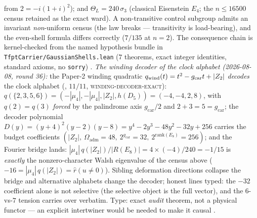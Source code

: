 \documentclass[11pt,a4paper]{article}
\newcommand{\gcar}{g_{\mathrm{car}}}
\newcommand{\Oadm}{\Omega_{\mathrm{adm}}}
\theoremstyle{definition}
\begin{document}
\begin{keybox}
from $2 = -i(1{+}i)^2$); and $\Theta_L = 240\,\sigma_3$
(classical Eisenstein $E_4$; the $n \le 16500$ census retained
as the exact ward).  A non-transitive control subgroup admits an
invariant \emph{non}-uniform census (the law breaks ---
transitivity is load-bearing), and the even-shell formula
differs correctly ($7/135$ at $n = 2$).  The consequence chain
is kernel-checked from the named hypothesis bundle in
\texttt{TfptCarrier/GaussianShells.lean} ($7$ theorems, exact
integer identities, standard axioms, no \texttt{sorry}) \mE.
\emph{The winding decoder of the clock alphabet (2026-08-08,
round 36):} the Paper-2 winding quadratic $q_{\rm wind}(t) = t^2
- \gcar t + |Z_2|$ \emph{decodes} the clock alphabet
(, $11/11$,
\textsc{winding-decoder-exact}): $q(\{2,3,5,6\}) =
(-|\mu_4|, -|\mu_4|, |Z_2|, h(D_5)) = (-4,-4,2,8)$, with $q(2) =
q(3)$ \emph{forced} by the palindrome axis $\gcar/2$ and $2 + 3
= 5 = \gcar$; the decoder polynomial $D(y) = (y{+}4)^2(y{-}2)
(y{-}8) = y^4 - 2y^3 - 48y^2 - 32y + 256$ carries the budget
coefficients $(|Z_2|,\ \Oadm = 48,\ 2^{\gcar} = 32,\
2^{\mathrm{rank}(E_8)} = 256)$; and the Fourier bridge lands:
$|\mu_4|\,q(|Z_2|)/|R(E_8)| = 4\times(-4)/240 = -1/15$ is
\emph{exactly} the nonzero-character Walsh eigenvalue of the
census above ($-16 = |\mu_4|\,q(|Z_2|) = \hat r(u \ne 0)$).
Sibling deformation directions collapse the bridge and
alternative alphabets change the decoder; honest lines typed:
the $-32$ coefficient alone is not selective (the selective
object is the full vector), and the $6$-vs-$7$ tension carries
over verbatim.  Type: exact \emph{audit} theorem, not a physical
functor --- an explicit intertwiner would be needed to make it
causal \mE.
\end{keybox}
\end{document}
